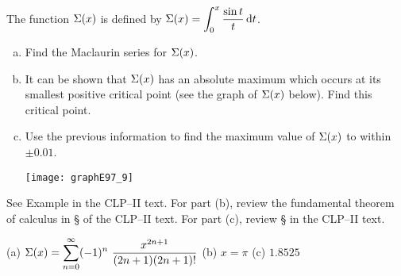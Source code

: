 \begin{Mquestion}[1997A]
 The function $\Sigma(x)$ is defined by $\Sigma(x)=\displaystyle\int_0^x\frac{\sin t}{t}\,\mathrm{d}t$.

\begin{enumerate}[(a)]
\item
Find the Maclaurin series for $\Sigma(x)$.
\item
 It can be shown that $\Sigma(x)$ has an absolute maximum which occurs at its smallest
positive critical point (see the graph of $\Sigma(x)$ below). Find this critical
point.
\item
 Use the previous information to find the maximum value
of $\Sigma(x)$ to within $\pm 0.01$.

\begin{center}
       \texttt{[image: graphE97\_9]}
\end{center}
\end{enumerate}
\end{Mquestion}

\begin{hint}
See Example  in the
CLP--II text.
For part (b), review  the fundamental theorem of calculus in \S {}
of the
CLP--II text.
For part (c), review  \S {} in the
CLP--II text.

\end{hint}

\begin{answer}
(a)
$\displaystyle\Sigma(x)
=\sum\limits_{n=0}^\infty (-1)^n\ \frac{x^{2n+1}}{(2n+1)(2n+1)!}$
\qquad (b)
$x=\pi$
\qquad (c)
$1.8525$
\end{answer}

